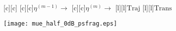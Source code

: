\documentclass{article}
\begin{document}
\begin{figure}[htb]
  \begin{center}

        [c][c]{}
        [c][c]{$\eta^{(m-1)} \rightarrow$}
        [c][c]{$\eta^{(m)} \rightarrow$}
        [l][l]{$\mathrm{Traj}$}
        [l][l]{$\mathrm{Trans}$}
	

    \texttt{[image: mue\_half\_0dB\_psfrag.eps]}
    \end{center}
\end{figure}
\end{document}
